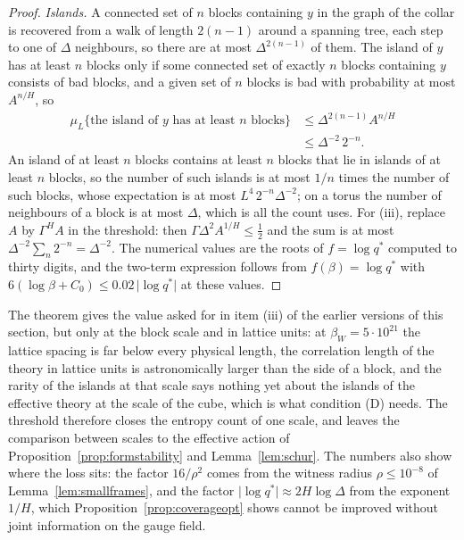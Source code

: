 \documentclass[11pt]{amsart}
\theoremstyle{definition}
\theoremstyle{remark}
\numberwithin{equation}{section}
\begin{document}
\begin{proof}
\emph{Islands.} A connected set of $n$ blocks containing $y$ in the graph
of the collar is recovered from a walk of length $2(n-1)$ around a spanning
tree, each step to one of $\varDelta$ neighbours, so there are at most
$\varDelta^{2(n-1)}$ of them. The island of $y$ has at least $n$ blocks
only if some connected set of exactly $n$ blocks containing $y$ consists
of bad blocks, and a given set of $n$ blocks is bad with probability at
most $A^{n/H}$, so
\[
\begin{split}
\mu_L\{\text{the island of $y$ has at least $n$ blocks}\}
&\le\varDelta^{2(n-1)}A^{n/H}\\
&\le\varDelta^{-2}\,2^{-n}.
\end{split}
\]
An island of at least $n$ blocks contains at least $n$ blocks that lie in
islands of at least $n$ blocks, so the number of such islands is at most
$1/n$ times the number of such blocks, whose expectation is at most
$L^4\,2^{-n}\varDelta^{-2}$; on a torus the number of neighbours of a
block is at most $\varDelta$, which is all the count uses. For (iii),
replace $A$ by $\varGamma^HA$ in the threshold: then $\varGamma\varDelta^2
A^{1/H}\le\frac12$ and the sum is at most $\varDelta^{-2}\sum_n2^{-n}=
\varDelta^{-2}$. The numerical values are the roots
of $f=\log q^*$ computed to thirty digits, and the two-term expression
follows from $f(\beta)=\log q^*$ with $6(\log\beta+C_0)\le0.02\,\lvert\log
q^*\rvert$ at these values.
\end{proof}

The theorem gives the value asked for in item (iii) of the earlier
versions of this section, but only at the block scale and in lattice
units: at $\beta_W=5\cdot10^{21}$ the lattice spacing is far below every
physical length, the correlation length of the theory in lattice units is
astronomically larger than the side of a block, and the rarity of the
islands at that scale says nothing yet about the islands of the effective
theory at the scale of the cube, which is what condition (D) needs. The
threshold therefore closes the entropy count of one scale, and leaves the
comparison between scales to the effective action of
Proposition~\ref{prop:formstability} and Lemma~\ref{lem:schur}. The
numbers also show where the loss sits: the factor $16/\rho^2$ comes from
the witness radius $\rho\le10^{-8}$ of Lemma~\ref{lem:smallframes}, and
the factor $\lvert\log q^*\rvert\approx2H\log\varDelta$ from the exponent
$1/H$, which Proposition~\ref{prop:coverageopt} shows cannot be improved
without joint information on the gauge field.
\end{document}
